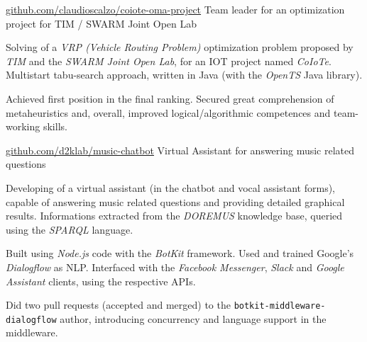 



\begin{cventries}

	\cvproj
		{\href{https://github.com/claudioscalzo/coiote-oma-project}{github.com/claudioscalzo/coiote-oma-project}}
		{Team leader for an optimization project for TIM / SWARM Joint Open Lab}
		{}
		{}
		{
			\begin{cvitems} %
				\item {Solving of a \textit{VRP (Vehicle Routing Problem)} optimization problem proposed by \textit{TIM} and the \textit{SWARM Joint Open Lab}, for an IOT project named \textit{CoIoTe}. Multistart tabu-search approach, written in Java (with the \textit{OpenTS} Java library).}
				\item {Achieved first position in the final ranking. Secured great comprehension of metaheuristics and, overall, improved logical/algorithmic competences and team-working skills.}
			\end{cvitems}
		}

	\cvproj
		{\href{https://github.com/D2KLab/music-chatbot}{github.com/d2klab/music-chatbot}}
		{Virtual Assistant for answering music related questions}
		{}
		{}
		{
			\begin{cvitems} %
				\item {Developing of a virtual assistant (in the chatbot and vocal assistant forms), capable of answering music related questions and providing detailed graphical results. Informations extracted from the \textit{DOREMUS} knowledge base, queried using the \textit{SPARQL} language.}
				\item {Built using \textit{Node.js} code with the \textit{BotKit} framework. Used and trained Google's \textit{Dialogflow} as NLP. Interfaced with the \textit{Facebook Messenger}, \textit{Slack} and \textit{Google Assistant} clients, using the respective APIs.}
				\item {Did two pull requests (accepted and merged) to the \texttt{botkit-middleware-dialogflow} author, introducing concurrency and language support in the middleware.}
			\end{cvitems}
		}
	

\end{cventries}
